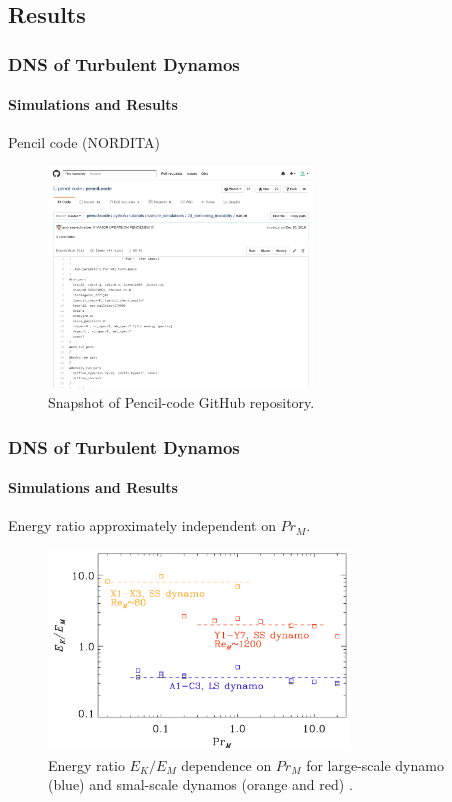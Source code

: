 \documentclass{beamer}
\begin{document}
\subsection{Results}

\begin{frame}
 \frametitle{DNS of Turbulent Dynamos}
 \framesubtitle{Simulations and Results}
 
 Pencil code (NORDITA)
 
 \begin{figure}[t]
  \includegraphics[width=7cm]{img/pencil-code}
  \caption{Snapshot of Pencil-code GitHub repository.}
  \centering
 \end{figure}
 
\end{frame}

\begin{frame}
 \frametitle{DNS of Turbulent Dynamos}
 \framesubtitle{Simulations and Results}
 
 Energy ratio approximately independent on $Pr_M$.
 
 \begin{figure}[t]
  \includegraphics[width=8cm]{img/energy_ratio}
  \caption{Energy ratio $E_K/E_M$ dependence on $Pr_M$ for large-scale dynamo (blue) and smal-scale dynamos (orange and red) \cite{brandenburg2014magnetic}.}
  \centering
 \end{figure}
 
\end{frame}
\end{document}
